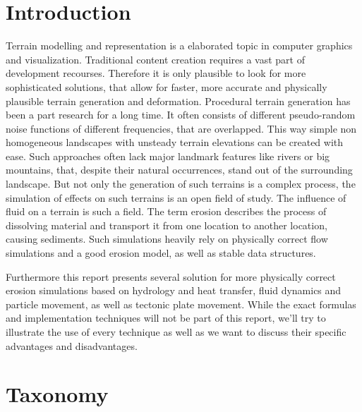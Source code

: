 \section{Introduction}

Terrain modelling  and representation is a elaborated topic in computer graphics and visualization. Traditional content creation requires a vast part of development recourses. Therefore it is only plausible to look for more sophisticated solutions, that allow for faster, more accurate and physically plausible terrain generation and deformation. Procedural terrain generation has been a part research for a long time. It often consists of different pseudo-random noise functions of different frequencies, that are overlapped. This way simple non homogeneous landscapes with unsteady terrain elevations can be created with ease. Such approaches often lack major landmark features like rivers or big mountains, that, despite their natural occurrences, stand out of the surrounding landscape. But not only the generation of such terrains is a complex process, the simulation of effects on such terrains is an open field of study. The influence of fluid on a terrain is such a field. The term erosion describes the process of dissolving material and transport it from one location to another location, causing sediments. Such simulations heavily rely on physically correct flow simulations and a good erosion model, as well as stable data structures. 

Furthermore this report presents several solution for more physically correct erosion simulations based on hydrology and heat transfer, fluid dynamics and particle movement, as well as tectonic plate movement. While the exact formulas  and implementation techniques will not be part of this report, we'll try to illustrate the use of every technique as well as we want to discuss their specific advantages and disadvantages.


\section{Taxonomy}

